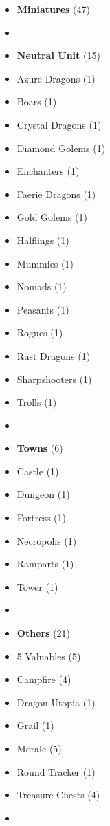 
\begin{multicols*}{2}

\footnotesize

\begin{itemize}[leftmargin=0pt, label={}, noitemsep]
  \item \textbf{\small{\underline{Miniatures}}} (47)
  \item
  \item \textbf{Neutral Unit} (15)
  \item Azure Dragons (1)
  \item Boars (1)
  \item Crystal Dragons (1)
  \item Diamond Golems (1)
  \item Enchanters (1)
  \item Faerie Dragons (1)
  \item Gold Golems (1)
  \item Halflings (1)
  \item Mummies (1)
  \item Nomads (1)
  \item Peasants (1)
  \item Rogues (1)
  \item Rust Dragons (1)
  \item Sharpshooters (1)
  \item Trolls (1)
  \item
  \item \textbf{Towns} (6)
  \item Castle (1)
  \item Dungeon (1)
  \item Fortress (1)
  \item Necropolis (1)
  \item Ramparts (1)
  \item Tower (1)
  \item
  \item \textbf{Others} (21)
  \item 5 Valuables (5)
  \item Campfire (4)
  \item Dragon Utopia (1)
  \item Grail (1)
  \item Morale (5)
  \item Round Tracker (1)
  \item Treasure Chests (4)
  \item

\end{itemize}
\end{multicols*}
